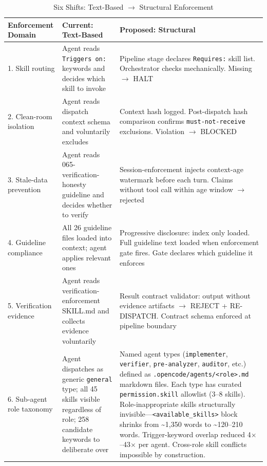 \documentclass[11pt,a4paper]{article}
\begin{document}
\begin{table}[htbp]
\centering
\caption{Six Shifts: Text-Based $\to$ Structural Enforcement}
\label{tab:shifts}
\small
\begin{tabular}{@{}p{3.2cm}p{4.3cm}p{5cm}@{}}
\toprule
\textbf{Enforcement Domain} & \textbf{Current: Text-Based}             & \textbf{Proposed: Structural} \\
\midrule
1. Skill routing
  & Agent reads \texttt{Triggers on:} keywords and decides which skill to invoke
  & Pipeline stage declares \texttt{Requires:} skill list.  Orchestrator checks mechanically.  Missing $\to$ HALT \\
\midrule
2. Clean-room isolation
  & Agent reads dispatch context schema and voluntarily excludes
  & Context hash logged.  Post-dispatch hash comparison confirms \texttt{must-not-receive} exclusions.  Violation $\to$ BLOCKED \\
\midrule
3. Stale-data prevention
  & Agent reads 065-verification-honesty guideline and decides whether to verify
  & Session-enforcement injects context-age watermark before each turn.  Claims without tool call within age window $\to$ rejected \\
\midrule
4. Guideline compliance
  & All 26 guideline files loaded into context; agent applies relevant ones
  & Progressive disclosure: index only loaded.  Full guideline text loaded when enforcement gate fires.  Gate declares which guideline it enforces \\
\midrule
5. Verification evidence
  & Agent reads verification-enforcement SKILL.md and collects evidence voluntarily
  & Result contract validator: output without evidence artifacts $\to$ REJECT + RE-DISPATCH.  Contract schema enforced at pipeline boundary \\
\midrule
6. Sub-agent role taxonomy
  & Agent dispatches as generic \texttt{general} type; all 45 skills visible regardless of role; 258 candidate keywords to deliberate over
  & Named agent types (\texttt{implementer}, \texttt{verifier}, \texttt{pre-analyzer}, \texttt{auditor}, etc.) defined as \texttt{.opencode/agents/<role>.md} markdown files.  Each type has curated \texttt{permission.skill} allowlist (3--8 skills).  Role-inappropriate skills structurally invisible---\texttt{<available\_skills>} block shrinks from \textasciitilde{}1,350 words to \textasciitilde{}120--210 words.  Trigger-keyword overlap reduced 4$\times$--43$\times$ per agent.  Cross-role skill conflicts impossible by construction. \\
\bottomrule
\end{tabular}
\end{table}
\end{document}
